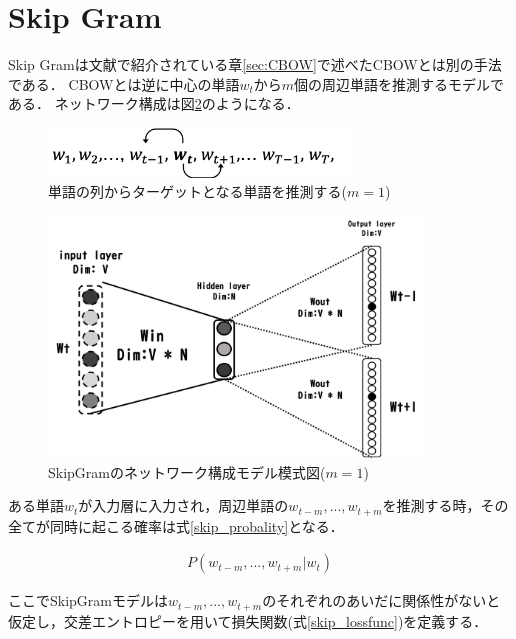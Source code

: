 \documentclass[a4j,11pt,report]{jsbook}
\begin{document}
\clearpage

\section{Skip Gram \label{sec:SkipGram}}
Skip Gramは文献\cite{SkipCBOW}で紹介されている章\ref{sec:CBOW}で述べたCBOWとは別の手法である．
CBOWとは逆に中心の単語$w_{t}$から$m$個の周辺単語を推測するモデルである．
ネットワーク構成は図\ref{fig:SkipGramimage}のようになる．

\begin{figure}[H]
  \centering
  \includegraphics[width = 80mm]{image/skipgram_w1w2wt-1wtwt+1.png}
  \caption{単語の列からターゲットとなる単語を推測する($m = 1$)}
  \label{fig:Skipformula}
\end{figure}


\begin{figure}[H]
  \centering
  \includegraphics[width = 100mm]{image/SkipGram_windowsize_1.png}
  \caption{SkipGramのネットワーク構成モデル模式図($ m = 1$) }
  \label{fig:SkipGramimage}
\end{figure}



ある単語$w_{t}$が入力層に入力され，周辺単語の$w_{t-m},...,w_{t+m}$を推測する時，その全てが同時に起こる確率は式\ref{skip_probality}となる．

\begin{equation}
  \label{skip_probality}
  \begin{array}{c}
    P(w_{t-m},...,w_{t+m}|w_{t})
  \end{array}
\end{equation}

ここでSkipGramモデルは$w_{t-m},...,w_{t+m}$のそれぞれのあいだに関係性がないと仮定し，交差エントロピーを用いて損失関数(式\ref{skip_lossfunc})を定義する．
\end{document}
